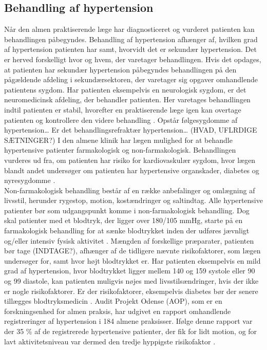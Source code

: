 \subsection{Behandling af hypertension}
Når den almen praktiserende læge har diagnosticeret og vurderet patienten kan behandlingen påbegyndes. Behandling af hypertension afhænger af, hvilken grad af hypertension patienten har samt, hvorvidt det er sekundær hypertension. Det er herved forskelligt hvor og hvem, der varetager behandlingen. Hvis det opdages, at patienten har sekundær hypertension påbegyndes behandlingen på den pågældende afdeling i sekundærsektoren, der varetager sig opgaver omhandlende patientens sygdom. Har patienten eksempelvis en neurologisk sygdom, er det neuromedicinsk afdeling, der behandler patienten. Her varetages behandlingen indtil patienten er stabil, hvorefter en praktiserende læge igen kan overtage patienten og kontrollere den videre behandling \citep{sundhedssyrelsen2010}. Opstår følgesygdomme af hypertension… Er det behandlingsrefraktær hypertension… (HVAD, UFLRDIGE SÆTNINGER?)
I den almene klinik har lægen mulighed for at behandle hypertensive patienter farmakologisk og non-farmakologisk. Behandlingen vurderes ud fra, om patienten har risiko for kardiovaskulær sygdom, hvor lægen blandt andet undersøger om patienten har hypertensive organskader, diabetes og nyresygdomme \citep{promedicin2016}. \\
Non-farmakologisk behandling består af en række anbefalinger og omlægning af livsstil, herunder rygestop, motion, kostændringer og saltindtag. Alle hypertensive patienter bør som udgangspunkt komme i non-farmakologisk behandling. Dog skal patienter med et blodtryk, der ligger over 180/105 mmHg, starte på en farmakologisk behandling for at sænke blodtrykket inden der udføres jævnligt og/eller intensiv fysisk aktivitet \citep{pedersen2016}.
Mængden af forskellige præparater, patienten bør tage (INDTAGE?), afhænger af de tidligere nævnte risikofaktorer, som lægen undersøger for, samt hvor højt blodtrykket er. Har patienten eksempelvis en mild grad af hypertension, hvor blodtrykket ligger mellem 140 og 159 systole eller 90 og 99 diastole, kan patienten muligvis nøjes med livsstilsændringer, hvis der ikke er nogle risikofaktorer. Er der risikofaktorer, eksempelvis diabetes bør der senere tillægges blodtryksmedicin \citep{bech2015}. Audit Projekt Odense (AOP), som er en forskningsenhed for almen praksis, har udgivet en rapport omhandlende registreringer af hypertension i 184 almene praksisser. Ifølge denne rapport var der 35 \% af de registrerede hypertensive patienter, der fik for lidt motion, og for lavt aktivitetsniveau var dermed den tredje hyppigste risikofaktor \citep{munch2007}. \\
